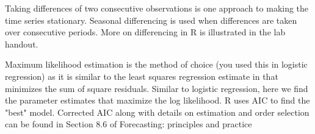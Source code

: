 \documentclass[10pt]{article}\usepackage[]{graphicx}\usepackage[]{color}
\begin{document}
Taking differences of two consecutive observations is one approach to making the time series stationary.  Seasonal differencing is used when differences are taken over consecutive periods. More on differencing in R is illustrated in the lab handout.

Maximum likelihood estimation is the method of choice (you used this in logistic regression) as it is similar to the least squares regression estimate in that minimizes the sum of square residuals. Similar to logistic regression, here we find the parameter estimates that maximize the log likelihood. R uses AIC to find the "best" model. Corrected AIC along with details on estimation and order selection can be found in Section 8.6 of Forecasting: principles and practice
\end{document}
